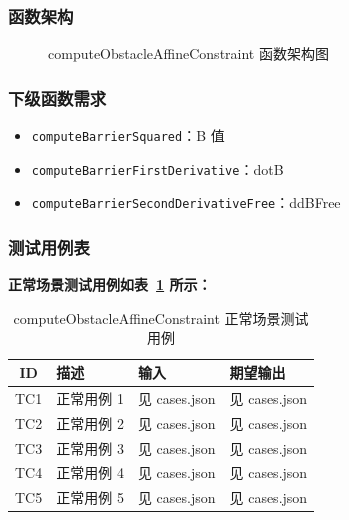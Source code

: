 \documentclass[a4paper,10pt]{article}
\begin{document}
\subsubsection{函数架构}
\begin{figure}[h]
    \centering
    \caption{computeObstacleAffineConstraint 函数架构图}
    \label{fig:arch_computeObstacleAffineConstraint}
\end{figure}
\subsubsection{下级函数需求}
\begin{itemize}
  \item \texttt{computeBarrierSquared}：B 值
  \item \texttt{computeBarrierFirstDerivative}：dotB
  \item \texttt{computeBarrierSecondDerivativeFree}：ddBFree
\end{itemize}

\subsubsection{测试用例表}
\noindent\textbf{正常场景测试用例如表~\ref{tab:normal_computeObstacleAffineConstraint} 所示：}
\begin{table}[h]
\centering
\caption{computeObstacleAffineConstraint 正常场景测试用例}
\label{tab:normal_computeObstacleAffineConstraint}
\begin{tabular}{|c|p{3.5cm}|p{3.5cm}|p{3.5cm}|}
\hline
ID & 描述 & 输入 & 期望输出 \\ \hline
  TC1 & 正常用例 1 & 见 cases.json & 见 cases.json \\ \hline
  TC2 & 正常用例 2 & 见 cases.json & 见 cases.json \\ \hline
  TC3 & 正常用例 3 & 见 cases.json & 见 cases.json \\ \hline
  TC4 & 正常用例 4 & 见 cases.json & 见 cases.json \\ \hline
  TC5 & 正常用例 5 & 见 cases.json & 见 cases.json \\ \hline
\end{tabular}
\end{table}
\end{document}
